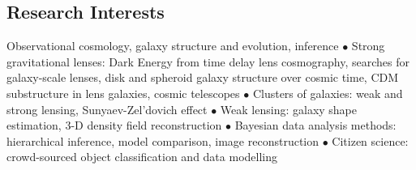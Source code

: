 \subsection*{Research Interests}

Observational cosmology, galaxy structure and evolution, inference
%
$\bullet$
%
Strong gravitational lenses:
  Dark Energy from time delay lens cosmography,
  searches for galaxy-scale lenses,
  disk and spheroid galaxy structure over cosmic time,
  CDM substructure in lens galaxies,
  cosmic telescopes
%
$\bullet$
%
Clusters of galaxies:
  weak and strong lensing,
  Sunyaev-Zel'dovich effect
%
$\bullet$
%
Weak lensing:
  galaxy shape estimation,
  3-D density field reconstruction
%
$\bullet$
%
Bayesian data analysis methods:
  hierarchical inference,
  model comparison,
  image reconstruction
%
$\bullet$
%
Citizen science:
  crowd-sourced object classification and data modelling
